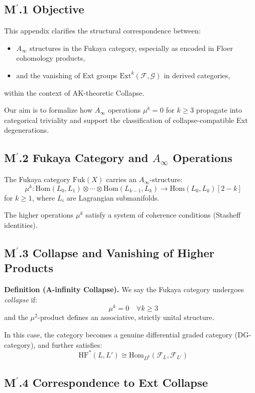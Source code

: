 \documentclass[11pt]{article}
\begin{document}
\begin{axiom}
\begin{axiom}
{{\subsection*{M$^\prime$.1 Objective}

This appendix clarifies the structural correspondence between:
\begin{itemize}
  \item \( A_\infty \) structures in the Fukaya category, especially as encoded in Floer cohomology products,
  \item and the vanishing of Ext groups \( \mathrm{Ext}^k(\mathcal{F}, \mathcal{G}) \) in derived categories,
\end{itemize}
within the context of AK-theoretic Collapse.

Our aim is to formalize how \( A_\infty \) operations \(\mu^k = 0\) for \(k \geq 3\) propagate into categorical triviality and support the classification of collapse-compatible Ext degenerations.

\subsection*{M$^\prime$.2 Fukaya Category and $A_\infty$ Operations}

The Fukaya category \( \mathrm{Fuk}(X) \) carries an \( A_\infty \)-structure:
\[
\mu^k : \mathrm{Hom}(L_0, L_1) \otimes \cdots \otimes \mathrm{Hom}(L_{k-1}, L_k) \to \mathrm{Hom}(L_0, L_k)[2 - k]
\]
for \( k \geq 1 \), where \( L_i \) are Lagrangian submanifolds.

The higher operations \( \mu^k \) satisfy a system of coherence conditions (Stasheff identities).

\subsection*{M$^\prime$.3 Collapse and Vanishing of Higher Products}

\textbf{Definition (A-infinity Collapse).}  
We say the Fukaya category undergoes \textit{collapse} if:
\[
\mu^k = 0 \quad \forall k \geq 3
\]
and the \( \mu^2 \)-product defines an associative, strictly unital structure.

In this case, the category becomes a genuine differential graded category (DG-category), and further satisfies:
\[
\mathrm{HF}^*(L, L') \cong \mathrm{Hom}_{D^b}(\mathcal{F}_L, \mathcal{F}_{L'})
\]

\subsection*{M$^\prime$.4 Correspondence to Ext Collapse}

}}
\end{axiom}
\end{axiom}
\end{document}
